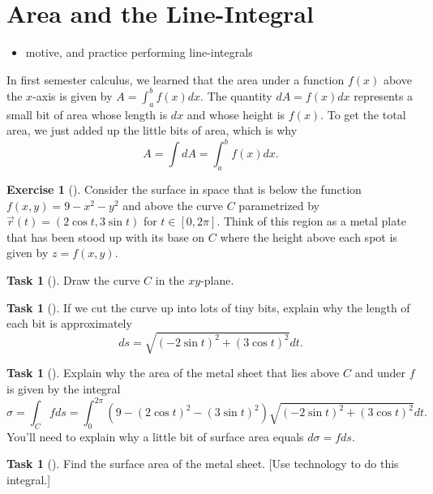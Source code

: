 \documentclass[10pt,]{book}
\theoremstyle{plain}
\theoremstyle{definition}
\theoremstyle{definition}
\theoremstyle{definition}
\theoremstyle{definition}
\newtheorem{exploration}[project]{Exercise}
\newtheorem{task}[project]{Task}
\theoremstyle{definition}
\numberwithin{equation}{section}
\begin{document}
\section[{Area and the Line-Integral}]{Area and the Line-Integral}\label{section-30}
\leavevmode%
\begin{itemize}[label=\textbullet]
\item{}motive, and practice performing line-integrals%
\end{itemize}
In first semester calculus, we learned that the area under a function \(f(x)\) above the \(x\)-axis is given by \(A = \int_a^b f(x) dx\). The quantity \(dA= f(x) dx\) represents a small bit of area whose length is \(dx\) and whose height is \(f(x)\). To get the total area, we just added up the little bits of area, which is why%
\begin{equation*}
A=\int dA = \int_a^b f(x) dx.
\end{equation*}
%
\begin{exploration}[]\label{exploration-197}
Consider the surface in space that is below the function \(f(x,y)=9-x^2-y^2\) and above the curve \(C\) parametrized by \(\vec r(t)=(2\cos t, 3\sin t)\) for \(t\in[0,2\pi]\). Think of this region as a metal plate that has been stood up with its base on \(C\) where the height above each spot is given by \(z=f(x,y)\).%
\begin{task}[]\label{task-500}
Draw the curve \(C\) in the \(xy\)-plane.%
\end{task}
\begin{task}[]\label{task-501}
If we cut the curve up into lots of tiny bits, explain why the length of each bit is approximately%
\begin{equation*}
ds=\sqrt{(-2\sin t)^2+(3\cos t)^2}dt.
\end{equation*}
%
\end{task}
\begin{task}[]\label{task-502}
Explain why the area of the metal sheet that lies above \(C\) and under \(f\) is given by the integral%
\begin{equation*}
\sigma = \int_C f ds = \int_0^{2\pi}(9-(2\cos t)^2-(3\sin t)^2)\sqrt{(-2\sin t)^2+(3\cos t)^2}dt.
\end{equation*}
You'll need to explain why a little bit of surface area equals \(d\sigma =fds\).%
\end{task}
\begin{task}[]\label{task-503}
Find the surface area of the metal sheet. [Use technology to do this integral.]%
\end{task}
\end{exploration}
\end{document}
